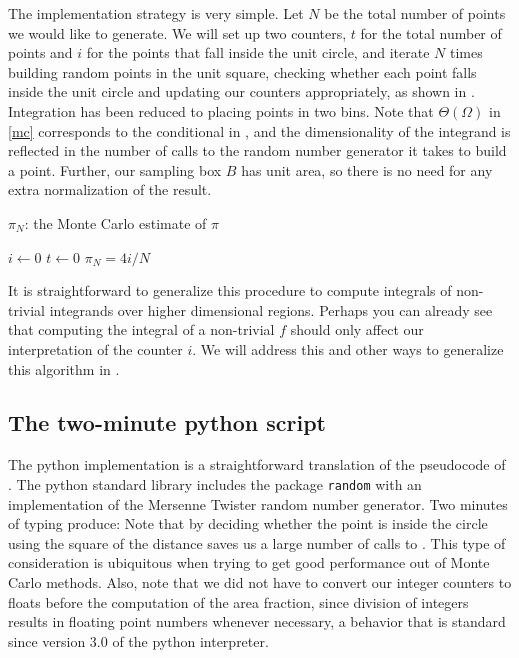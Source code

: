 The implementation strategy is very simple. Let $N$ be the total number of points we would like
to generate. We will set up two counters, $t$ for the total number of points and $i$ for the
points that fall inside the unit circle, and iterate $N$ times building random points in the
unit square, checking whether each point falls inside the unit circle and updating our counters
appropriately, as shown in .  Integration has been reduced to placing points in two
bins. Note that $\Theta(\Omega)$ in \eqref{mc} corresponds to the conditional in
, and the dimensionality of the integrand is reflected in the number of
calls to the random number generator it takes to build a point. Further, our sampling box $B$
has unit area, so there is no need for any extra normalization of the result.
%
\begin{algorithm}
\caption{$\pi_{N}$: the Monte Carlo estimate of $\pi$ \label{alg:pi}}
%
\DontPrintSemicolon
\SetAlgoNoEnd
%
$i \leftarrow 0$ \;
$t \leftarrow 0$ \;
$\pi_{N} = 4 i/N \;$ %
\end{algorithm}
%

It is straightforward to generalize this procedure to compute integrals of non-trivial
integrands over higher dimensional regions. Perhaps you can already see that computing the
integral of a non-trivial $f$ should only affect our interpretation of the counter $i$. We will
address this and other ways to generalize this algorithm in .

\subsection{The two-minute python script}
\label{sec:simple:python}

The python implementation is a straightforward translation of the pseudocode of
. The python standard library\supercite{python-doc} includes the package {\tt random}
with an implementation of the Mersenne Twister\supercite{mersenne-twister} random number
generator. Two minutes of typing produce:
%
%
Note that by deciding whether the point is inside the circle using the square of the distance
saves us a large number of calls to . This type of consideration is ubiquitous
when trying to get good performance out of Monte Carlo methods.  Also, note that we did not
have to convert our integer counters to floats before the computation of the area fraction,
since division of integers results in floating point numbers whenever necessary, a behavior
that is standard since version 3.0 of the python interpreter.

